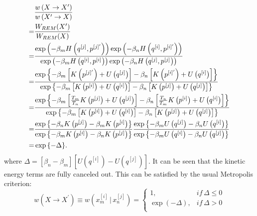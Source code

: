 \begin{align}
	&\frac{w\left(X\rightarrow X^\prime\right)}{w\left(X^\prime\rightarrow X\right)}\notag\\
	=&\frac{W_{REM}(X^\prime)}{W_{REM}(X)}\notag\\
	   =&\frac{\exp{\left(-\beta_m H\left(q^{[j]},p^{[j]^\prime}\right)\right)}\exp{\left(-\beta_n H\left(q^{[i]},p^{[i]^\prime}\right)\right)}}{\exp{\left(-\beta_m H\left(q^{[i]},p^{[i]^{ }}\right)\right)}\exp{\left(-\beta_n H\left(q^{[j]},p^{[j]^{ }}\right)\right)}}\notag\\
	   =&\frac{\exp{\left\{-\beta_m\left[K\left(p^{[j]^\prime}\right)+U\left(q^{[j]}\right)\right]-\beta_n\left[K\left(p^{[i]^\prime}\right)+U\left(q^{[i]}\right)\right]\notag\right\}}}
	   {\exp{\left\{-\beta_m\left[K\left(p^{[i]}\right)+U\left(q^{[i]}\right)\right]-\beta_n\left[K\left(p^{[j]}\right)+U\left(q^{[j]}\right)\right]\notag\right\}}}\notag\\
	   =&\frac{\exp{\left\{-\beta_m\left[\frac{T_m}{T_n}K\left(p^{[j]}\right)+U\left(q^{[j]}\right)\right]-\beta_n\left[\frac{T_n}{T_m}K\left(p^{[i]}\right)+U\left(q^{[i]}\right)\right]\notag\right\}}}
	   {\exp{\left\{-\beta_m\left[K\left(p^{[i]}\right)+U\left(q^{[i]}\right)\right]-\beta_n\left[K\left(p^{[j]}\right)+U\left(q^{[j]}\right)\right]\notag\right\}}}\notag\\
	   =&\frac{\exp{\left\{-\beta_n K\left(p^{[j]}\right)-\beta_m K\left(p^{[i]}\right)\right\}}}{\exp{\left\{-\beta_m K\left(p^{[i]}\right)-\beta_n K\left(p^{[j]}\right)\right\}}} \frac{\exp{\left\{-\beta_m U\left(q^{[j]}\right)-\beta_n U\left(q^{[i]}\right)\right\}}}{\exp{\left\{-\beta_m U\left(q^{[i]}\right)-\beta_n U\left(q^{[j]}\right)\right\}}}\notag\\
	   =&\exp{\left\{-\Delta\right\}}.
\end{align}
where $\Delta = \left[\beta_n-\beta_m\right]\left[U\left(q^{[i]}\right)-U\left(q^{[j]}\right)\right]$. It can be seen that the kinetic energy terms are fully canceled out.
This can be satisfied by the usual Metropolis criterion:
\begin{equation}
	w\left(X\rightarrow X^\prime\right)\equiv w\left(x_m^{[i]}\, \bigg\rvert\, x_n^{[j]}\right)= 
	\left\{ 
	\begin{array}{ll} 
		1, & if\, \Delta \leq 0\\ 
		\exp{(-\Delta)}, & if\, \Delta >0\\  
	\end{array} 
	\right. 
\end{equation}

